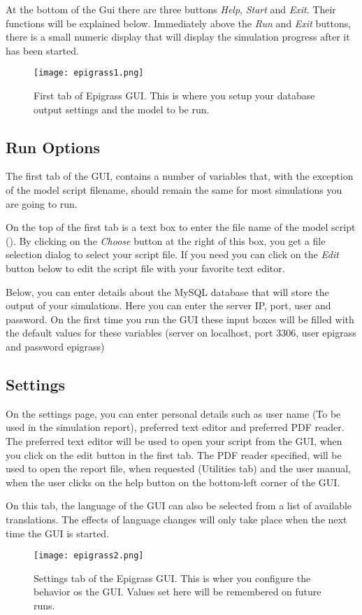 \documentclass[a4paper,10pt,english]{sphinxmanual}
\begin{document}
At the bottom of the Gui there are three buttons \emph{Help}, \emph{Start} and \emph{Exit}. Their functions will be explained below. Immediately above the \emph{Run} and \emph{Exit} buttons, there is a small numeric display that will display the simulation progress after it has been started.
\begin{figure}[htbp]
\centering
\capstart

\texttt{[image: epigrass1.png]}
\caption{First tab of Epigrass GUI. This is where you setup your database output settings and the model to be run.}\end{figure}


\subsection{Run Options}
\label{using:run-options}
The first tab of the GUI, contains a number of variables that, with the exception of the model script filename, should remain the same for most simulations you are going to run.

On the top of the first tab is a text box to enter the file name of the model script (). By clicking on the \emph{Choose} button at the right of this box, you get a file selection dialog to select your script file. If you need you can click on the \emph{Edit} button below to edit the script file with your favorite text editor.

Below, you can enter details about the MySQL database that will store the output of your simulations. Here you can enter the server IP, port, user and password. On the first time you run the GUI these input boxes will be filled with the default values for these variables (server on localhost, port 3306, user epigrass and password epigrass)


\subsection{Settings}
\label{using:settings}
On the settings page, you can enter personal details such as user name (To be used in the simulation report), preferred text editor and preferred PDF reader. The preferred text editor will be used to open your script from the GUI, when you click on the edit button in the first tab. The PDF reader specified, will be used to open the report file, when requested (Utilities tab) and the user manual, when the user clicks on the help button on the bottom-left corner of the GUI.

On this tab, the language of the GUI can also be selected from a list of available translations. The effects of language changes will only take place when the next time the GUI is started.
\begin{figure}[htbp]
\centering
\capstart

\texttt{[image: epigrass2.png]}
\caption{Settings tab of the Epigrass GUI. This is wher you configure the behavior os the GUI. Values set here will be remembered on future runs.}\end{figure}
\end{document}
